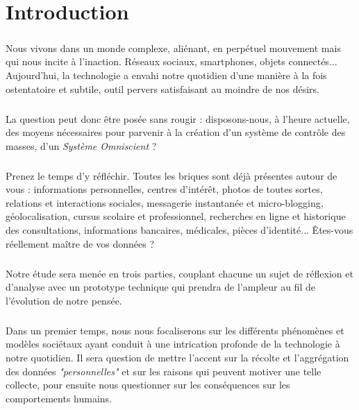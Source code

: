 \chapter{Introduction}

\paragraph{} Nous vivons dans un monde complexe, aliénant, en perpétuel mouvement mais qui
nous incite à l'inaction. Réseaux sociaux, smartphones, objets connectés... Aujourd'hui, la
technologie a envahi notre quotidien d'une manière à la fois ostentatoire et subtile, outil
pervers satisfaisant au moindre de nos désirs.

\paragraph{} La question peut donc être posée sans rougir : disposons-nous, à l'heure
actuelle, des moyens nécessaires pour parvenir à la création d'un système de contrôle des
masses, d'un \emph{Système Omniscient} ?

\paragraph{} Prenez le temps d'y réfléchir. Toutes les briques sont déjà présentes autour
de vous : informations personnelles, centres d'intérêt, photos de toutes sortes, relations
et interactions sociales, messagerie instantanée et micro-blogging, géolocalisation,
cursus scolaire et professionnel, recherches en ligne et historique des consultations,
informations bancaires, médicales, pièces d'identité... Êtes-vous réellement maître de vos
données ?

\paragraph{} Notre étude sera menée en trois parties, couplant chacune un sujet de réflexion
et d'analyse avec un prototype technique qui prendra de l'ampleur au fil de l'évolution de
notre pensée.

\paragraph{} Dans un premier temps, nous nous focaliserons sur les différents phénomènes
et modèles sociétaux ayant conduit à une intrication profonde de la technologie à notre
quotidien. Il sera question de mettre l'accent sur la récolte et l'aggrégation des données
\emph{"personnelles"} et sur les raisons qui peuvent motiver une telle collecte, pour ensuite
nous questionner sur les conséquences sur les comportements humains.

